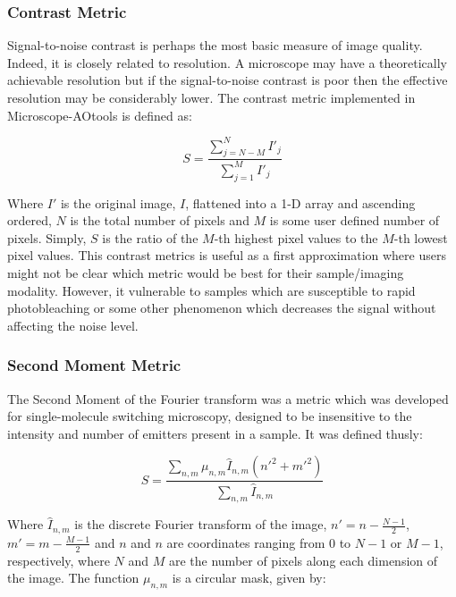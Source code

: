 \subsubsection{Contrast Metric}

Signal-to-noise contrast is perhaps the most basic measure of image quality. Indeed, it is closely related to resolution. A microscope may have a theoretically achievable resolution but if the signal-to-noise contrast is poor then the effective resolution may be considerably lower. The contrast metric implemented in Microscope-AOtools is defined as:

\begin{equation}\label{eq:contrast_metric}
S = \frac{\sum\limits_{j=N-M}^{N}{I'_{j}}}{\sum\limits_{j=1}^{M}{I'_{j}}}
\end{equation}

Where $I'$ is the original image, $I$, flattened into a 1-D array and ascending ordered, $N$ is the total number of pixels and $M$ is some user defined number of pixels. Simply, $S$ is the ratio of the $M$-th highest pixel values to the $M$-th lowest pixel values. This contrast metrics is useful as a first approximation where users might not be clear which metric would be best for their sample/imaging modality. However, it vulnerable to samples which are susceptible to rapid photobleaching or some other phenomenon which decreases the signal without affecting the noise level. 

\subsubsection{Second Moment Metric}

The Second Moment of the Fourier transform was a metric which was developed for single-molecule switching microscopy, designed to be insensitive to the intensity and number of emitters present in a sample.\cite{burke2015adaptive} It was defined thusly:

\begin{equation}\label{eq:second_moment_metric_old}
S = \frac{\sum\limits_{n,m}{\mu_{n,m}\hat{I}_{n,m}(n'^{2} + m'^{2})}}{\sum\limits_{n,m}{\hat{I}_{n,m}}}
\end{equation}

Where $\hat{I}_{n,m}$ is the discrete Fourier transform of the image, $n' = n - \frac{N-1}{2}$, $m' = m - \frac{M-1}{2}$ and $n$ and $n$ are coordinates ranging from $0$ to $N-1$ or $M-1$, respectively, where $N$ and $M$ are the number of pixels along each dimension of the image. The
function $\mu_{n,m}$ is a circular mask, given by:

